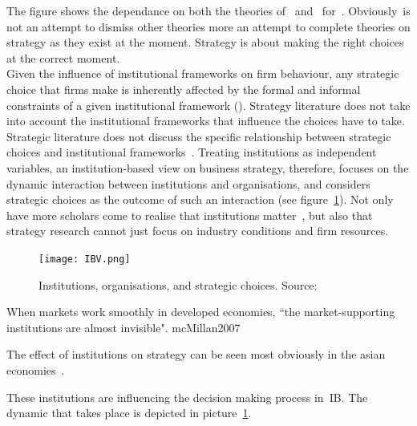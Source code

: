 The figure shows the dependance on both the theories of~\cite{Barney:2001} and~\cite{Porter:1980} for~\ibv. Obviously~\ibv is not an attempt to dismiss other theories more an attempt to complete theories on strategy as they exist at the moment. Strategy is about making the right choices at the correct moment. \\
Given the influence of institutional frameworks on firm behaviour, any strategic choice that firms make is inherently affected by the formal and informal constraints of a given institutional framework (\cite{North:1990,Oliver:1997}). 
Strategy literature does not take into account the institutional frameworks that influence the choices \mne have to take. 
Strategic literature does not discuss the specific relationship between strategic choices and institutional frameworks~\cite{Peng:2008}.
Treating institutions as independent variables, an institution-based view on business strategy, therefore, focuses on the dynamic interaction between institutions and organisations, and considers strategic choices as the outcome of such an interaction (see figure~\ref{fig:ibv})\cite{Peng:2002}.
Not only have more scholars come to realise that institutions matter~\cite{Powell:1991,Scott:1995}, but also that strategy research cannot just focus on industry conditions and firm resources.~\cite{Khanna:1997}\\


%


\begin{figure}[htbp!]
	\centering
	\texttt{[image: IBV.png]}
 	\caption{Institutions, organisations, and strategic choices. Source:~\cite{Peng:2000}}
 	\label{fig:ibv}
\end{figure}



When markets work smoothly in developed economies, ``the market-supporting institutions are almost invisible". mcMillan2007


The effect of institutions on strategy can be seen most obviously in the asian economies~\cite{Peng:2002}.











These institutions are influencing the decision making process in~\gls{IB}.  The dynamic that takes place is depicted in picture~\ref{fig:ibv}. 


